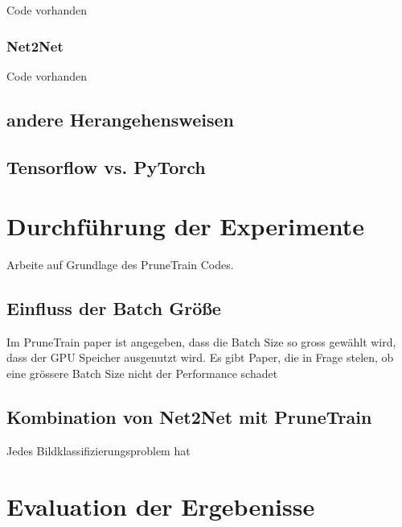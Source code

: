 Code vorhanden


\subsubsection{Net2Net}

Code vorhanden

\subsection{andere Herangehensweisen}




\subsection{Tensorflow vs. PyTorch}


\section{Durchführung der Experimente}
Arbeite auf Grundlage des PruneTrain Codes.


\subsection{Einfluss der Batch Größe}
Im PruneTrain paper ist angegeben, dass die Batch Size so gross gewählt wird, dass der GPU Speicher ausgenutzt wird. 
Es gibt Paper, die in Frage stelen, ob eine grössere Batch Size nicht der Performance schadet \cite{largeBatch}



\subsection{Kombination von Net2Net mit PruneTrain}
Jedes Bildklassifizierungsproblem hat 


\section{Evaluation der Ergebenisse}
